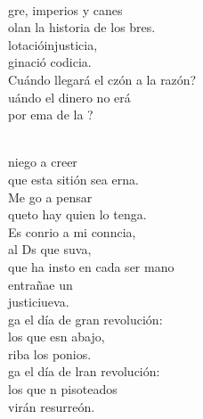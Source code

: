\documentclass[12pt]{article}
\begin{document}
\begin{multicols*}{2}
\begin{cancion}%
	    \\
	gre, imperios y canes\\
	olan la historia de los bres.\\
	lotacióinjusticia,\\
	ginació codicia.\\
	Cuándo llegará el czón a la razón?\\
	uándo el dinero no erá \\
	por ema de la ? \\\jump\\
	\begin{chorus}%
	 niego a creer\\
	que esta sitión sea erna.\\
	Me go a pensar \\
	queto hay quien lo tenga.\\
	Es conrio a mi conncia,\\
	al Ds que suva,\\
	que ha insto en cada ser mano\\
	entrañae un\\
	justiciueva.   \\
	ga el día de gran revolución:\\
	los que esn abajo,  \\
	riba los ponios.\\
	ga el día de lran revolución:\\
	los que n pisoteados \\
	virán resurreón.\\
	\end{chorus}%
	\jump\\

\end{cancion}
\end{multicols*}
\end{document}

